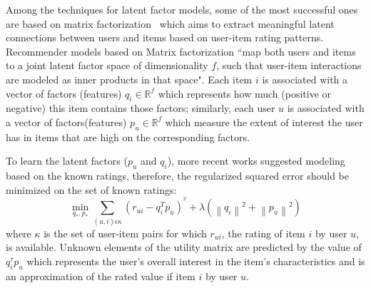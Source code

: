 Among the techniques for latent factor models, some of the most successful ones are based on matrix factorization~\cite{koren2009matrix} which aims to extract meaningful latent connections between users and items based on user-item rating patterns. Recommender models based on Matrix factorization ``map both users and items to a joint latent factor space of dimensionality $f$, such that user-item interactions are modeled as inner products in that space". Each item $i$ is associated with a vector of factors (features) 
$q_{i}\in \mathbb{R}^{f}$
which represents how much (positive or negative) this item contains those factors; similarly, each user $u$ is associated with a vector of factors(features) 
$p_{u}\in \mathbb{R}^{f}$
which measure the extent of interest the user has in items that are high on the corresponding factors. 


To learn the latent factors ($p_{u}$ and $q_{i}$), more recent works suggested modeling based on the known ratings, therefore, the regularized squared error should be minimized on the set of 
known ratings:
\begin{equation} \tag{1}
   \min_{q_{*},p_{*}} \sum_{(u,i) \epsilon \kappa }  (r_{ui}-q_{i}^{T}p_{u})^{^2}+\lambda \left ( \left \| q_{i}\right \|^2+\left \| p_{u}\right \|^2 \right )            \label{equation}
\end{equation}
where $\kappa$ is the set of user-item pairs for which $r_{ui}$, the rating of item $i$ by user $u$, is available. Unknown elements of the utility matrix are predicted by the value of $q_{i}^{\tau }p_{u}$ which represents the user’s overall interest in the item’s characteristics and is an approximation of the rated value if item $i$ by user $u$. 




